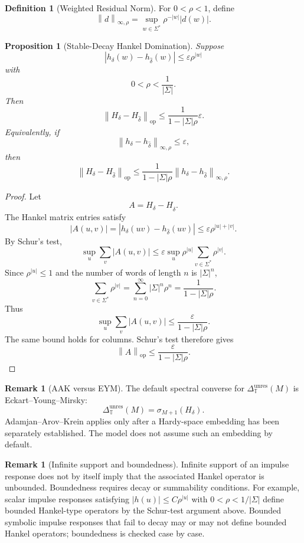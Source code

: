 \documentclass[12pt]{article}
\newtheorem{proposition}[theorem]{Proposition}
\theoremstyle{definition}
\newtheorem{definition}[theorem]{Definition}
\newtheorem{remark}[theorem]{Remark}
\newcommand{\norm}[1]{\left\lVert#1\right\rVert}
\begin{document}
\begin{definition}[Weighted Residual Norm]
\label{def:weighted-residual-norm}
For $0<\rho<1$, define
\[
\norm{d}_{\infty,\rho}
=
\sup_{w\in\Sigma^*}
\rho^{-|w|}
|d(w)|.
\]
\end{definition}

\begin{proposition}[Stable-Decay Hankel Domination]
\label{prop:stable-decay}
Suppose
\[
|h_\delta(w)-h_{\widehat\delta}(w)|
\le
\varepsilon\rho^{|w|}
\]
with
\[
0<\rho<\frac1{|\Sigma|}.
\]
Then
\[
\norm{H_\delta-H_{\widehat\delta}}_{\mathrm{op}}
\le
\frac{1}{1-|\Sigma|\rho}
\varepsilon.
\]
Equivalently, if
\[
\norm{h_\delta-h_{\widehat\delta}}_{\infty,\rho}
\le
\varepsilon,
\]
then
\[
\norm{H_\delta-H_{\widehat\delta}}_{\mathrm{op}}
\le
\frac{1}{1-|\Sigma|\rho}
\norm{h_\delta-h_{\widehat\delta}}_{\infty,\rho}.
\]
\end{proposition}

\begin{proof}
Let
\[
A=H_\delta-H_{\widehat\delta}.
\]
The Hankel matrix entries satisfy
\[
|A(u,v)|
=
|h_\delta(uv)-h_{\widehat\delta}(uv)|
\le
\varepsilon\rho^{|u|+|v|}.
\]
By Schur's test,
\[
\sup_u\sum_v |A(u,v)|
\le
\varepsilon
\sup_u
\rho^{|u|}
\sum_{v\in\Sigma^*}
\rho^{|v|}.
\]
Since $\rho^{|u|}\le1$ and the number of words of length $n$ is
$|\Sigma|^n$,
\[
\sum_{v\in\Sigma^*}\rho^{|v|}
=
\sum_{n=0}^\infty
|\Sigma|^n\rho^n
=
\frac{1}{1-|\Sigma|\rho}.
\]
Thus
\[
\sup_u\sum_v |A(u,v)|
\le
\frac{\varepsilon}{1-|\Sigma|\rho}.
\]
The same bound holds for columns.  Schur's test therefore gives
\[
\norm{A}_{\mathrm{op}}
\le
\frac{\varepsilon}{1-|\Sigma|\rho}.
\]
\end{proof}

\begin{remark}[AAK versus EYM]
\label{rem:aak-eym-hilbert}
The default spectral converse for
$\Delta_{\mathbb T}^{\mathrm{unres}}(M)$ is Eckart--Young--Mirsky:
\[
\Delta_{\mathbb T}^{\mathrm{unres}}(M)
=
\sigma_{M+1}(H_\delta).
\]
Adamjan--Arov--Krein applies only after a Hardy-space embedding has been
separately established.  The model does not assume such an embedding by
default.
\end{remark}

\begin{remark}[Infinite support and boundedness]
\label{rem:infinite-support}
Infinite support of an impulse response does not by itself imply that the
associated Hankel operator is unbounded.  Boundedness requires decay or
summability conditions.  For example, scalar impulse responses satisfying
$|h(u)|\le C\rho^{|u|}$ with $0<\rho<1/|\Sigma|$ define bounded Hankel-type
operators by the Schur-test argument above.  Bounded symbolic impulse
responses that fail to decay may or may not define bounded Hankel operators;
boundedness is checked case by case.
\end{remark}
\end{document}
